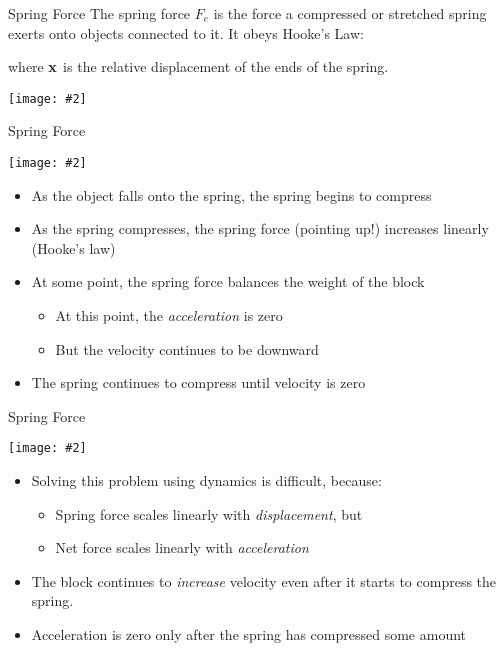 \documentclass[12pt,compress,aspectratio=169]{beamer}
\newcommand{\pic}[2]{\texttt{[image: \#2]}}
\newcommand{\mb}[1]{\ensuremath\mathbf{#1}}
\newcommand{\eq}[2]{\vspace{#1}{\Large\begin{displaymath}#2\end{displaymath}}}
\begin{document}
\begin{frame}{Spring Force}
  The spring force $F_e$ is the force a compressed or stretched spring
  exerts onto objects connected to it. It obeys Hooke's Law:
  
  \eq{-.2in}{
    \mb{F}_e=-k\mb{x}
  }
  where $\mb{x}$ is the relative displacement of the ends of the spring.
  \begin{center}
    \pic{.35}{graphics/spring-example1.png}
  \end{center}
\end{frame}


\begin{frame}{Spring Force}
  \begin{center}
    \pic{.28}{graphics/spring-example1.png}
  \end{center}
  \begin{itemize}
  \item\vspace{-.15in}As the object falls onto the spring, the spring begins to
    compress
  \item As the spring compresses, the spring force (pointing up!) increases
    linearly (Hooke's law)
  \item At some point, the spring force balances the weight of the block
    \begin{itemize}
    \item At this point, the \emph{acceleration} is zero
    \item But the velocity continues to be downward
    \end{itemize}
  \item The spring continues to compress until velocity is zero
  \end{itemize}
\end{frame}



\begin{frame}{Spring Force}
  \begin{center}
    \pic{.28}{graphics/spring-example1.png}
  \end{center}
  \begin{itemize}
  \item\vspace{-.15in}Solving this problem using dynamics is difficult, because:
    \begin{itemize}
    \item Spring force scales linearly with \emph{displacement}, but
    \item Net force scales linearly with \emph{acceleration}
    \end{itemize}
  \item The block continues to \emph{increase} velocity even after
    it starts to compress the spring.
  \item Acceleration is zero only after the spring has compressed some amount
  \end{itemize}
\end{frame}
\end{document}
